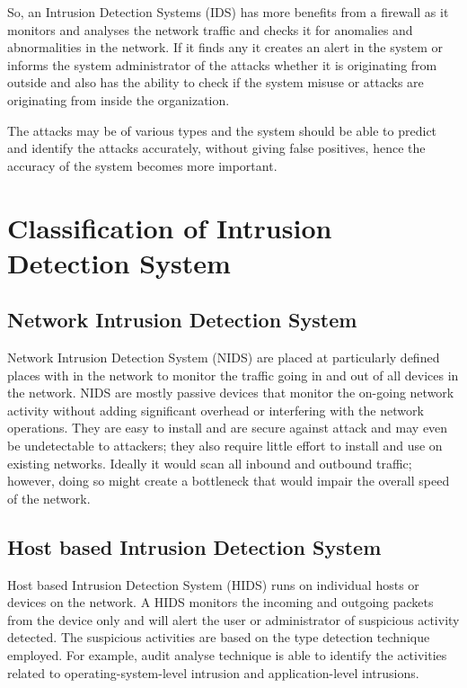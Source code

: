 \documentclass[12pt, a4paper]{report}
\begin{document}
So, an Intrusion Detection Systems (IDS) has more benefits from a firewall as it monitors and analyses the network traffic and checks it for anomalies and abnormalities in the network. If it finds any it creates an alert in the system or informs the system administrator of the attacks whether it is originating from outside and also has the ability to check if the system misuse or attacks are originating from inside the organization.\\ \par

The attacks may be of various types and the system should be able to predict and identify the attacks accurately, without giving false positives, hence the accuracy of the system becomes more important. \\ \par

\section{Classification of Intrusion Detection System}
\subsection{Network Intrusion Detection System}
Network Intrusion Detection System (NIDS) are placed at particularly defined places with in the network to monitor the traffic going in and out of all devices in the network. NIDS are mostly passive devices that monitor the on-going network activity without adding significant overhead or interfering with the network operations. They are easy to install and are secure against attack and may even be undetectable to attackers; they also require little effort to install and use on existing networks. Ideally it would scan all inbound and outbound traffic; however, doing so might create a bottleneck that would impair the overall speed of the network.

\subsection{Host based Intrusion Detection System}
Host based Intrusion Detection System (HIDS) runs on individual hosts or devices on the network. A HIDS monitors the incoming and outgoing packets from the device only and will alert the user or administrator of suspicious activity detected. The suspicious activities are based on the type detection technique employed. For example, audit analyse  technique is able to identify the activities related to operating-system-level intrusion and application-level intrusions.
\end{document}
